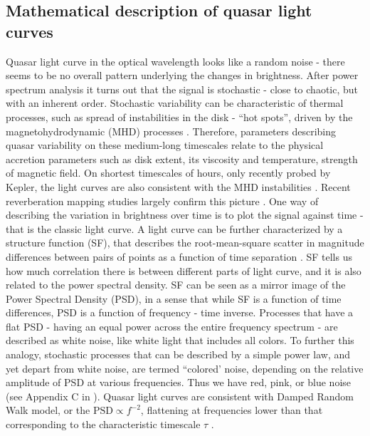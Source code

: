 \documentclass[modern]{aastex62}
\begin{document}
\subsection{Mathematical description of quasar light curves}
Quasar light curve in the optical wavelength looks like a random noise - there seems to be no overall pattern underlying the changes in brightness. After power spectrum analysis it turns out that the signal is stochastic - close to chaotic, but with an inherent order. Stochastic variability can be characteristic of thermal processes, such as spread of instabilities in the disk - ``hot spots'', driven by the magnetohydrodynamic (MHD) processes \citep{kelly2007, dexter2011, zu2013, kozlowski2016a}. Therefore, parameters describing quasar variability on these medium-long timescales relate to the physical accretion parameters such as disk extent, its viscosity and temperature, strength of magnetic field. On shortest timescales of hours, only recently probed by Kepler, the light curves are also consistent with  the MHD instabilities \citep{kasliwal2015a, aranzana2018, smith2018}. Recent reverberation mapping studies largely confirm this picture \citep{sun2015}. One way of describing the variation in brightness over time is to plot the signal against time - that is the classic light curve.  A light curve can be further characterized by a structure function (SF), that describes the root-mean-square scatter in magnitude differences between pairs of points as a function of time separation \citep{graham2014}. SF tells us how much correlation there is between different parts of light curve, and it is also related to the power spectral density. SF can be seen as a mirror image of the Power Spectral Density (PSD), in a sense that while SF is a function of time differences, PSD is a function of frequency - time inverse. Processes that have a flat PSD - having an equal power across the entire frequency spectrum -  are described as white noise, like white light that includes all colors. To further this analogy, stochastic processes that can be described by a simple power law, and yet depart from white noise, are termed  ``colored' noise, depending on the relative amplitude of PSD at various frequencies. Thus we have red, pink, or blue noise   (see Appendix  C in \citealt{kasliwal2017}). Quasar light curves are consistent with Damped Random Walk model, or the $\mathrm{PSD} \propto  f^{-2}$, flattening at frequencies lower than that corresponding to the characteristic timescale $\tau$ \citep{macleod2010,zu2013}.
\end{document}
